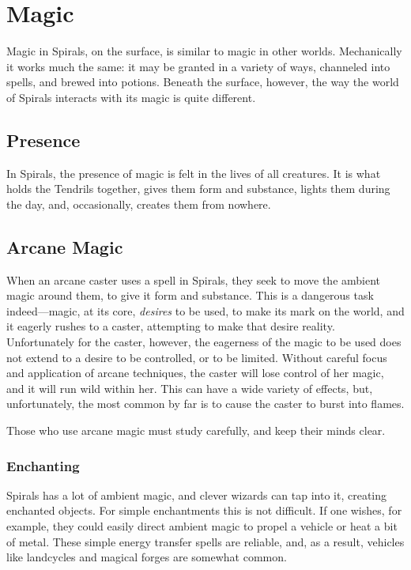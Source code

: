 \chapter{Magic}
\label{chapter:magic}

Magic in Spirals, on the surface, is similar to magic in other worlds.
Mechanically it works much the same: it may be granted in a variety of ways, channeled into spells, and brewed into potions.
Beneath the surface, however, the way the world of Spirals interacts with its magic is quite different.

\begin{multicols}{2}
\section{Presence}
In Spirals, the presence of magic is felt in the lives of all creatures.
It is what holds the Tendrils together, gives them form and substance, lights them during the day, and, occasionally, creates them from nowhere.


\section{Arcane Magic}
When an arcane caster uses a spell in Spirals, they seek to move the ambient magic around them, to give it form and substance.
This is a dangerous task indeed---magic, at its core, \textit{desires} to be used, to make its mark on the world, and it eagerly rushes to a caster, attempting to make that desire reality.
Unfortunately for the caster, however, the eagerness of the magic to be used does not extend to a desire to be controlled, or to be limited.
Without careful focus and application of arcane techniques, the caster will lose control of her magic, and it will run wild within her.
This can have a wide variety of effects, but, unfortunately, the most common by far is to cause the caster to burst into flames.

Those who use arcane magic must study carefully, and keep their minds clear.

\subsection{Enchanting}
Spirals has a lot of ambient magic, and clever wizards can tap into it, creating enchanted objects.
For simple enchantments this is not difficult.
If one wishes, for example, they could easily direct ambient magic to propel a vehicle or heat a bit of metal.
These simple energy transfer spells are reliable, and, as a result, vehicles like landcycles and magical forges are somewhat common.


\end{multicols}
